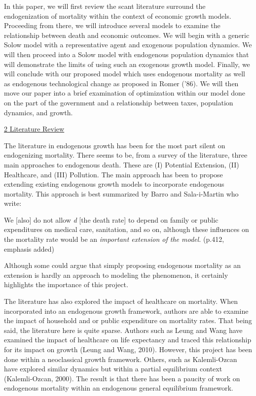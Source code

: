 \documentclass[12pt]{article}%
\begin{document}
	In this paper, we will first review the scant literature surround the endogenization of mortality within the context of economic growth models. Proceeding from there, we will introduce several models to examine the relationship between death and economic outcomes. We will begin with a generic Solow model with a representative agent and exogenous population dynamics. We will then proceed into a Solow model with endogenous population dynamics that will demonstrate the limits of using such an exogenous growth model. Finally, we will conclude with our proposed model which uses endogenous mortality as well as endogenous technological change as proposed in Romer (’86). We will then move our paper into a brief examination of optimization within our model done on the part of the government and a relationship between taxes, population dynamics, and growth.

\underline{2 Literature Review}

	The literature in endogenous growth has been for the most part silent on endogenizing mortality. There seems to be, from a survey of the literature, three main approaches to endogenous death. These are (I) Potential Extension, (II) Healthcare, and (III) Pollution. The main approach has been to propose extending existing endogenous growth models to incorporate endogenous mortality. This approach is best summarized by Barro and Sala-i-Martin who write:

We [also] do not allow \textit{d} [the death rate] to depend on family or public expenditures on medical care, sanitation, and so on, although these influences on the mortality rate would be an \textit{important extension of the model.} (p.412, emphasis added)

Although some could argue that simply proposing endogenous mortality as an extension is hardly an approach to modeling the phenomenon, it certainly highlights the importance of this project.

	The literature has also explored the impact of healthcare on mortality. When incorporated into an endogenous growth framework, authors are able to examine the impact of household and or public expenditure on mortality rates. That being said, the literature here is quite sparse. Authors such as Leung and Wang have examined the impact of healthcare on life expectancy and traced this relationship for its impact on growth (Leung and Wang, 2010). However, this project has been done within a neoclassical growth framework. Others, such as Kalemli-Ozcan have explored similar dynamics but within a partial equilibrium context (Kalemli-Ozcan, 2000). The result is that there has been a paucity of work on endogenous mortality within an endogenous general equilibrium framework.
\end{document}
